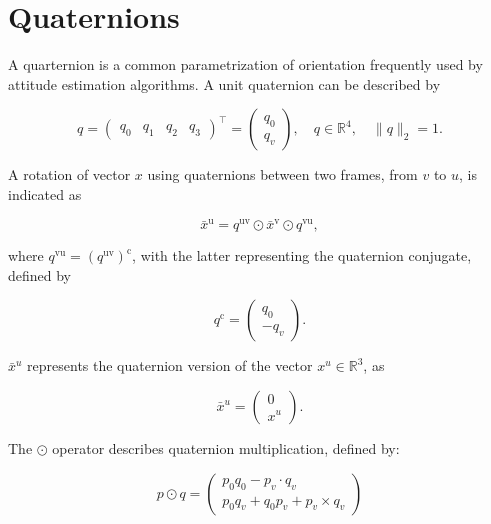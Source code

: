 \section{Quaternions}
\label{sec:app_quaternion}
A quarternion is a common parametrization of orientation frequently used by attitude estimation algorithms. A unit quaternion can be described by

\begin{equation}
	\label{eq:app_unit_quarternion}
	q=\left(\begin{array}{llll}{q_{0}} & {q_{1}} & {q_{2}} & {q_{3}}\end{array}\right)^{\top}
	=\left(\begin{array}{l}{q_{0}} \\ {q_{v}}\end{array}\right), 
	\quad q \in \mathbb{R}^{4}, 
	\quad\|q\|_{2}=1.
\end{equation}

A rotation of vector $x$ using quaternions between two frames, from $v$ to $u$, is indicated as

\begin{equation}
	\label{eq:app_quat_rot}
	\bar{x}^{\mathrm{u}}=q^{\mathrm{uv}} \odot \bar{x}^{\mathrm{v}} \odot q^{\mathrm{vu}},
\end{equation}

where $q^{\mathrm{vu}} = \left(q^{\mathrm{uv}}\right)^{\mathrm{c}}$, with the latter representing the quaternion conjugate, defined by 

\begin{equation}
	\label{eq:app_quat_conjugate}
	q^{\mathrm{c}}=\left(\begin{array}{c}{q_{0}} \\ {-q_{v}}\end{array}\right).
\end{equation}

$\bar{x}^u$ represents the quaternion version of the vector $x^u \in \mathbb{R}^3$, as

\begin{equation}
	\label{eq:app_quat_vec_ref}
	\bar{x}^u=\left(\begin{array}{l}{0} \\ {x^u}\end{array}\right).
\end{equation}


The $\odot$ operator describes quaternion multiplication, defined by:

\begin{equation}
	\label{eq:app_quat_multiplication}
	p \odot q=\left(\begin{array}{c}{p_{0} q_{0}-p_{v} \cdot q_{v}} \\ {p_{0} q_{v}+q_{0} p_{v}+p_{v} \times q_{v}}\end{array}\right)
\end{equation}

